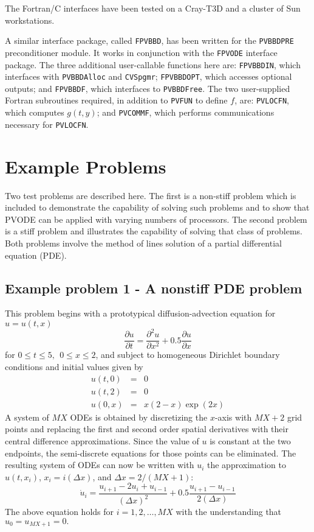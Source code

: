 The Fortran/C interfaces have been tested on a Cray-T3D and a cluster
of Sun workstations.

A similar interface package, called {\tt FPVBBD}, has been written for the 
{\tt PVBBDPRE} preconditioner module. It works in conjunction with the
{\tt FPVODE} interface package. The three additional user-callable functions here
are: {\tt FPVBBDIN}, which interfaces with {\tt PVBBDAlloc} and {\tt CVSpgmr};
{\tt FPVBBDOPT}, which accesses optional outputs; and {\tt FPVBBDF}, which
interfaces to {\tt PVBBDFree}. The two user-supplied Fortran subroutines
required, in addition to {\tt PVFUN} to define $f$, are: {\tt PVLOCFN}, which
computes $g(t,y)$; and {\tt PVCOMMF}, which performs communications necessary
for {\tt PVLOCFN}.


\section{Example Problems}

Two test problems are described here. The first is a non-stiff problem which
is included to demonstrate the capability of solving such problems and to
show that PVODE can be applied with varying numbers of processors. The
second problem is a stiff problem and illustrates the capability of solving
that class of problems. Both problems involve the method of lines solution
of a partial differential equation (PDE).

\subsection{Example problem 1 - A nonstiff PDE problem}

This problem begins with a prototypical diffusion-advection equation
for $u=u(t,x)$
\begin{equation}
\frac{\partial u}{\partial t}=\frac{\partial ^{2}u}{\partial x^{2}}
   + 0.5\frac{\partial u}{\partial x}  \label{PDE1}
\end{equation}
for $0 \leq t \leq 5, ~~ 0\leq x \leq 2$, and subject to homogeneous
Dirichlet boundary conditions and initial values given by 
\begin{eqnarray}
u(t,0) &=& 0  \label{BCIC1} \\
u(t,2) &=& 0  \nonumber \\
u(0,x) &=& x(2-x)\exp (2x)  \nonumber
\end{eqnarray}
A system of $MX$ ODEs is obtained by discretizing the $x$-axis with $MX+2$
grid points and replacing the first and second order spatial derivatives
with their central difference approximations. Since the value of $u$ is
constant at the two endpoints, the semi-discrete equations for those points
can be eliminated. The resulting system of ODEs can now be written
with $u_{i}$ the approximation to $u(t,x_{i})$, $x_{i}=i(\Delta x)$,
and $\Delta x=2/(MX+1)$:
\begin{equation}
\dot{u}_i=\frac{u_{i+1}-2u_{i}+u_{i-1}}{(\Delta x)^{2}}
  + 0.5 \frac{u_{i+1}-u_{i-1}}{2(\Delta x)}  \label{sd1}
\end{equation}
The above equation holds for $i=1,2,\ldots ,MX$ with the understanding
that $u_{0}=u_{MX+1}=0.$

